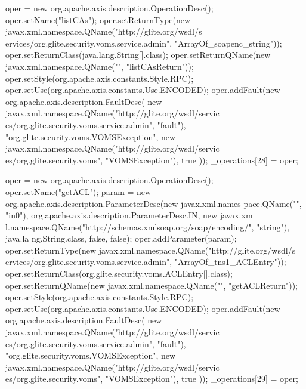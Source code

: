 \begin{DoxyCode}
{        oper = new org.apache.axis.description.OperationDesc();
        oper.setName("listCAs");
        oper.setReturnType(new javax.xml.namespace.QName("http://glite.org/wsdl/s
      ervices/org.glite.security.voms.service.admin", "ArrayOf_soapenc_string"));
        oper.setReturnClass(java.lang.String[].class);
        oper.setReturnQName(new javax.xml.namespace.QName("", "listCAsReturn"));
        oper.setStyle(org.apache.axis.constants.Style.RPC);
        oper.setUse(org.apache.axis.constants.Use.ENCODED);
        oper.addFault(new org.apache.axis.description.FaultDesc(
                      new javax.xml.namespace.QName("http://glite.org/wsdl/servic
      es/org.glite.security.voms.service.admin", "fault"),
                      "org.glite.security.voms.VOMSException",
                      new javax.xml.namespace.QName("http://glite.org/wsdl/servic
      es/org.glite.security.voms", "VOMSException"), 
                      true
                     ));
        _operations[28] = oper;

        oper = new org.apache.axis.description.OperationDesc();
        oper.setName("getACL");
        param = new org.apache.axis.description.ParameterDesc(new javax.xml.names
      pace.QName("", "in0"), org.apache.axis.description.ParameterDesc.IN, new javax.xm
      l.namespace.QName("http://schemas.xmlsoap.org/soap/encoding/", "string"), java.la
      ng.String.class, false, false);
        oper.addParameter(param);
        oper.setReturnType(new javax.xml.namespace.QName("http://glite.org/wsdl/s
      ervices/org.glite.security.voms.service.admin", "ArrayOf_tns1_ACLEntry"));
        oper.setReturnClass(org.glite.security.voms.ACLEntry[].class);
        oper.setReturnQName(new javax.xml.namespace.QName("", "getACLReturn"));
        oper.setStyle(org.apache.axis.constants.Style.RPC);
        oper.setUse(org.apache.axis.constants.Use.ENCODED);
        oper.addFault(new org.apache.axis.description.FaultDesc(
                      new javax.xml.namespace.QName("http://glite.org/wsdl/servic
      es/org.glite.security.voms.service.admin", "fault"),
                      "org.glite.security.voms.VOMSException",
                      new javax.xml.namespace.QName("http://glite.org/wsdl/servic
      es/org.glite.security.voms", "VOMSException"), 
                      true
                     ));
        _operations[29] = oper;

    }
\end{DoxyCode}
